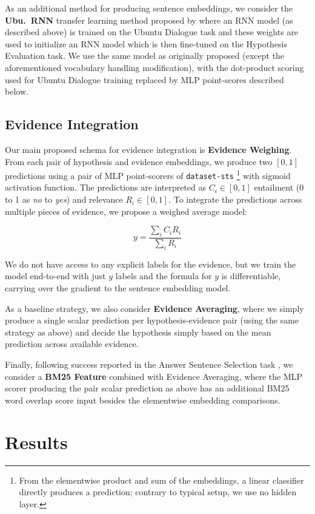 \documentclass[11pt]{article}
\begin{document}
As an additional method for producing sentence embeddings, we consider
the \textbf{Ubu.\ RNN} transfer learning method proposed by \cite{sps} where an RNN model
(as described above) is trained on the Ubuntu Dialogue task \cite{UbuntuLowe}
and these weights are used to initialize an RNN model which is then fine-tuned
on the Hypothesis Evaluation task.  We use the same model as originally proposed (except the aforementioned vocabulary handling modification),
with the dot-product scoring used for Ubuntu Dialogue training replaced by MLP point-scores described below.

\subsection{Evidence Integration}

Our main proposed schema for evidence integration is \textbf{Evidence Weighing}.
From each pair of hypothesis and evidence embeddings, we produce two $[0,1]$
predictions using a pair of MLP point-scorers of \texttt{dataset-sts} \cite{sps}%
\footnote{From the elementwise product
and sum of the embeddings, a linear classifier directly produces a prediction;
contrary to typical setup, we use no hidden layer.}
with sigmoid activation function.  The predictions are interpreted as $C_i \in [0,1]$
entailment (0 to 1 as \textit{no} to \textit{yes}) and relevance $R_i \in [0,1]$.
To integrate the predictions across multiple pieces of evidence,
we propose a weighed average model:

$$ y  = \frac{\sum_i C_iR_i}{\sum_i R_i} $$

We do not have access to any explicit labels for the evidence,
but we train the model end-to-end with just $y$ labels and the formula
for $y$ is differentiable, carrying over the gradient to the sentence
embedding model.

As a baseline strategy, we also consider \textbf{Evidence Averaging}, where
we simply produce a single scalar prediction per hypothesis-evidence pair
(using the same strategy as above) and decide the hypothesis simply based
on the mean prediction across available evidence.

Finally, following success reported in the Answer Sentence Selection task \cite{sps},
we consider a \textbf{BM25 Feature} combined with Evidence Averaging,
where the MLP scorer producing the pair scalar prediction as above has
an additional BM25 word overlap score input \cite{BM25} besides the elementwise
embedding comparisons.

\section{Results}
\label{sec:res}
\end{document}

